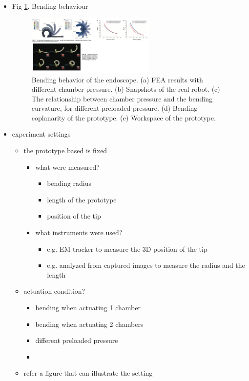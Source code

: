 \documentclass[journal,onecolumn]{IEEEtran}
\begin{document}
\begin{itemize}
\item Fig \ref{fig:orgbab9cca}. Bending behaviour 

\begin{figure}[!h]
\centering
\includegraphics[width=0.6\textwidth]{./fig/fig-bending_behavior.png}
\caption{\label{fig:orgbab9cca}
Bending behavior of the endoscope. (a) FEA results with different chamber pressure. (b) Snapshots of the real robot. (c) The relationship between chamber pressure and the bending curvature, for different preloaded pressure. (d) Bending coplanarity of the prototype. (e) Workspace of the prototype.}
\end{figure}

\item experiment settings
\begin{itemize}
\item the prototype based is fixed
\begin{itemize}
\item what were measured?
\begin{itemize}
\item bending radius
\item length of the prototype
\item position of the tip
\end{itemize}
\item what instruments were used?
\begin{itemize}
\item e.g. EM tracker to measure the 3D position of the tip
\item e.g. analyzed from captured images to measure the radius and the length
\end{itemize}
\end{itemize}
\item actuation condition?
\begin{itemize}
\item bending when actuating 1 chamber
\item bending when actuating 2 chambers
\item different preloaded pressure
\item 
\end{itemize}
\item refer a figure that can illustrate the setting
\end{itemize}
\end{itemize}
\end{document}
